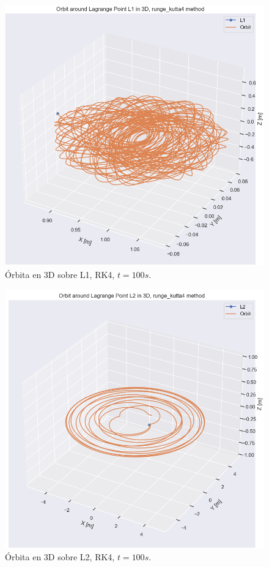 \documentclass[12pt,a4paper]{article}
\begin{document}
\begin{figure}[H]
	\centering
	\includegraphics[width=\x\textwidth]{FIGURES/mil6/L1_orbit_rk4_t100.png}
	\caption{Órbita en 3D sobre L1, RK4, $t = 100 s$.}
	\label{L1_orbit_rk4_t100}
\end{figure}
\begin{figure}[H]
	\centering
	\includegraphics[width=\x\textwidth]{FIGURES/mil6/L2_orbit_rk4_t100.png}
	\caption{Órbita en 3D sobre L2, RK4, $t = 100 s$.}
	\label{L2_orbit_rk4_t100}
\end{figure}
\end{document}
